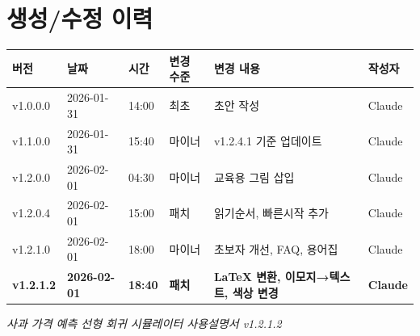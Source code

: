 \documentclass[11pt,a4paper]{article}
\begin{document}
\section*{생성/수정 이력}

\begin{center}
\begin{tabular}{llllll}
\toprule
\textbf{버전} & \textbf{날짜} & \textbf{시간} & \textbf{변경 수준} & \textbf{변경 내용} & \textbf{작성자} \\
\midrule
v1.0.0.0 & 2026-01-31 & 14:00 & 최초 & 초안 작성 & Claude \\
v1.1.0.0 & 2026-01-31 & 15:40 & 마이너 & v1.2.4.1 기준 업데이트 & Claude \\
v1.2.0.0 & 2026-02-01 & 04:30 & 마이너 & 교육용 그림 삽입 & Claude \\
v1.2.0.4 & 2026-02-01 & 15:00 & 패치 & 읽기순서, 빠른시작 추가 & Claude \\
v1.2.1.0 & 2026-02-01 & 18:00 & 마이너 & 초보자 개선, FAQ, 용어집 & Claude \\
\textbf{v1.2.1.2} & \textbf{2026-02-01} & \textbf{18:40} & \textbf{패치} & \textbf{LaTeX 변환, 이모지→텍스트, 색상 변경} & \textbf{Claude} \\
\bottomrule
\end{tabular}
\end{center}

\vfill
\begin{center}
\textit{사과 가격 예측 선형 회귀 시뮬레이터 사용설명서 v1.2.1.2}
\end{center}
\end{document}
